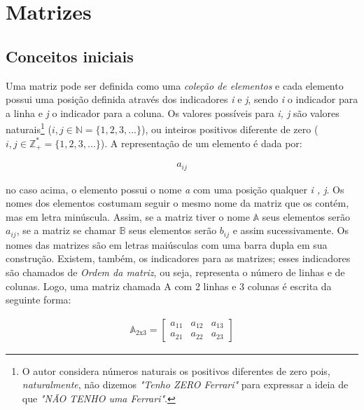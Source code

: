 
\chapter{Matrizes}

\section{Conceitos iniciais}


Uma matriz pode ser definida como uma \textit{coleção de elementos} e cada elemento possui uma posição definida através dos indicadores \textit{i} e \textit{j}, sendo \textit{i} o indicador para a linha e \textit{j} o indicador para a coluna. Os valores possíveis para \textit{i, j} são valores naturais\footnote{O autor considera números naturais os positivos diferentes de zero pois, \textit{naturalmente}, não dizemos \textit{"Tenho ZERO Ferrari"} para expressar a ideia de que \textit{"NÃO TENHO uma Ferrari"}.} ($i, j \in \mathbb{N} = \{1,2,3,... \}$), ou inteiros positivos diferente de zero ($i, j \in \mathbb{Z}_{+}^{*} = \{ 1, 2, 3, ... \}$).
A representação de um elemento é dada por:

\begin{ceqn}
	\begin{align*}
	a_{ij}
	\end{align*}
\end{ceqn}

no caso acima, o elemento possui o nome \textit{a} com uma posição qualquer \textit{i , j}. Os nomes dos elementos costumam seguir o
mesmo nome da matriz que os contém, mas em letra minúscula. Assim, se a matriz tiver o nome $\mathbb{A}$ seus elementos serão $a_{i j}$,
se a matriz se chamar $\mathbb{B}$ seus elementos serão $b_{i j}$ e assim sucessivamente. Os nomes das matrizes são em letras maiúsculas
com uma barra dupla em sua construção. 
Existem, também, os indicadores para as matrizes; esses indicadores são chamados de \textit{Ordem da matriz}, ou seja, representa o número
de linhas e de colunas. Logo, uma matriz chamada A com 2 linhas e 3 colunas é escrita da seguinte forma:

\begin{ceqn}
	\begin{align*}
	\mathbb{A}_{2\mathrm{{x}}3}=\left[\begin{array}{ccc}
	a_{11} & a_{12} & a_{13}\\
	a_{21} & a_{22} & a_{23}
	\end{array}\right]
	\end{align*}
\end{ceqn}

